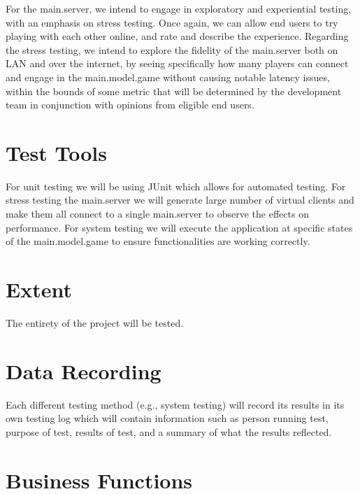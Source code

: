 \documentclass{article}
\begin{document}
For the main.server, we intend to engage in exploratory and experiential testing, with an emphasis on stress testing. Once again, we can allow end users to try playing with each other online, and rate and describe the experience. Regarding the stress testing, we intend to explore the fidelity of the main.server both on LAN and over the internet, by seeing specifically how many players can connect and engage in the main.model.game without causing notable latency issues, within the bounds of some metric that will be determined by the development team in conjunction with opinions from eligible end users.

\section{Test Tools}

For unit testing we will be using JUnit which allows for automated testing. For stress testing the main.server we will generate large number of virtual clients and make them all connect to a single main.server to observe the effects on performance. For system testing we will execute the application at specific states of the main.model.game to ensure functionalities are working correctly.

\section{Extent}

The entirety of the project will be tested.

\section{Data Recording}

Each different testing method (e.g., system testing) will record its results in its own testing log which will contain information such as person running test, purpose of test, results of test, and a summary of what the results reflected.

\section{Business Functions}
\end{document}
